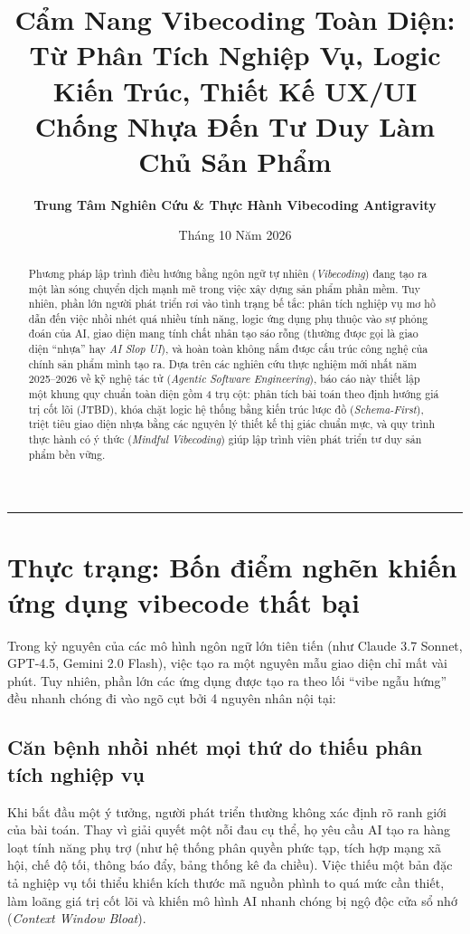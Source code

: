 \documentclass[a4paper,11pt]{article}
\title{\textbf{Cẩm Nang Vibecoding Toàn Diện: Từ Phân Tích Nghiệp Vụ, Logic Kiến Trúc, Thiết Kế UX/UI Chống Nhựa Đến Tư Duy Làm Chủ Sản Phẩm}}
\author{\textbf{Trung Tâm Nghiên Cứu \& Thực Hành Vibecoding Antigravity}}
\date{Tháng 10 Năm 2026}
\begin{document}
\maketitle

\begin{abstract}
Phương pháp lập trình điều hướng bằng ngôn ngữ tự nhiên (\textit{Vibecoding}) đang tạo ra một làn sóng chuyển dịch mạnh mẽ trong việc xây dựng sản phẩm phần mềm. Tuy nhiên, phần lớn người phát triển rơi vào tình trạng bế tắc: phân tích nghiệp vụ mơ hồ dẫn đến việc nhồi nhét quá nhiều tính năng, logic ứng dụng phụ thuộc vào sự phỏng đoán của AI, giao diện mang tính chất nhân tạo sáo rỗng (thường được gọi là giao diện ``nhựa'' hay \textit{AI Slop UI}), và hoàn toàn không nắm được cấu trúc công nghệ của chính sản phẩm mình tạo ra. Dựa trên các nghiên cứu thực nghiệm mới nhất năm 2025--2026 về kỹ nghệ tác tử (\textit{Agentic Software Engineering}), báo cáo này thiết lập một khung quy chuẩn toàn diện gồm 4 trụ cột: phân tích bài toán theo định hướng giá trị cốt lõi (JTBD), khóa chặt logic hệ thống bằng kiến trúc lược đồ (\textit{Schema-First}), triệt tiêu giao diện nhựa bằng các nguyên lý thiết kế thị giác chuẩn mực, và quy trình thực hành có ý thức (\textit{Mindful Vibecoding}) giúp lập trình viên phát triển tư duy sản phẩm bền vững.
\end{abstract}

\vspace{1em}
\rule{\textwidth}{0.4pt}

\section{Thực trạng: Bốn điểm nghẽn khiến ứng dụng vibecode thất bại}

Trong kỷ nguyên của các mô hình ngôn ngữ lớn tiên tiến (như Claude 3.7 Sonnet, GPT-4.5, Gemini 2.0 Flash), việc tạo ra một nguyên mẫu giao diện chỉ mất vài phút. Tuy nhiên, phần lớn các ứng dụng được tạo ra theo lối ``vibe ngẫu hứng'' đều nhanh chóng đi vào ngõ cụt bởi 4 nguyên nhân nội tại:

\subsection{Căn bệnh nhồi nhét mọi thứ do thiếu phân tích nghiệp vụ}

Khi bắt đầu một ý tưởng, người phát triển thường không xác định rõ ranh giới của bài toán. Thay vì giải quyết một nỗi đau cụ thể, họ yêu cầu AI tạo ra hàng loạt tính năng phụ trợ (như hệ thống phân quyền phức tạp, tích hợp mạng xã hội, chế độ tối, thông báo đẩy, bảng thống kê đa chiều). Việc thiếu một bản đặc tả nghiệp vụ tối thiểu khiến kích thước mã nguồn phình to quá mức cần thiết, làm loãng giá trị cốt lõi và khiến mô hình AI nhanh chóng bị ngộ độc cửa sổ nhớ (\textit{Context Window Bloat}).
\end{document}
